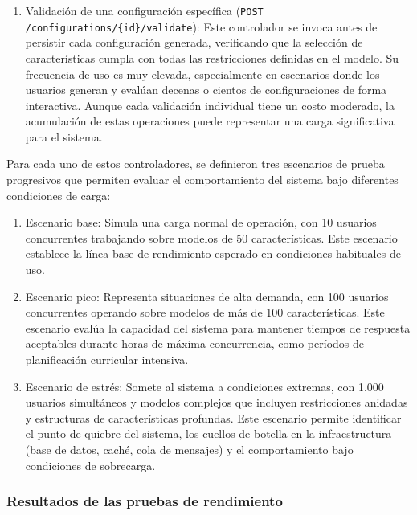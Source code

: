 \begin{enumerate}
    \item Validación de una configuración específica (\texttt{POST /configurations/\{id\}/validate}): 
    Este controlador se invoca antes de persistir cada configuración generada, verificando que la selección 
    de características cumpla con todas las restricciones definidas en el modelo. Su frecuencia de uso es 
    muy elevada, especialmente en escenarios donde los usuarios generan y evalúan decenas o cientos de 
    configuraciones de forma interactiva. Aunque cada validación individual tiene un costo moderado, la 
    acumulación de estas operaciones puede representar una carga significativa para el sistema.
\end{enumerate}

Para cada uno de estos controladores, se definieron tres escenarios de prueba progresivos que permiten evaluar 
el comportamiento del sistema bajo diferentes condiciones de carga:

\begin{enumerate}
    \item Escenario base: Simula una carga normal de operación, con 10 usuarios concurrentes trabajando 
    sobre modelos de 50 características. Este escenario establece la línea base de rendimiento esperado en 
    condiciones habituales de uso.
    
    \item Escenario pico: Representa situaciones de alta demanda, con 100 usuarios concurrentes operando 
    sobre modelos de más de 100 características. Este escenario evalúa la capacidad del sistema para mantener 
    tiempos de respuesta aceptables durante horas de máxima concurrencia, como períodos de planificación 
    curricular intensiva.
    
    \item Escenario de estrés: Somete al sistema a condiciones extremas, con 1.000 usuarios simultáneos 
    y modelos complejos que incluyen restricciones anidadas y estructuras de características profundas. Este 
    escenario permite identificar el punto de quiebre del sistema, los cuellos de botella en la infraestructura 
    (base de datos, caché, cola de mensajes) y el comportamiento bajo condiciones de sobrecarga.
\end{enumerate}


\subsubsection{Resultados de las pruebas de rendimiento}


